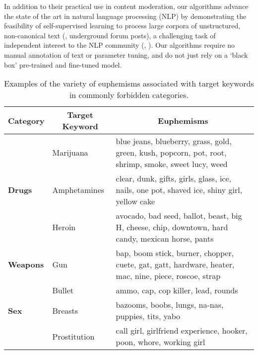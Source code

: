 In addition to their practical use in content moderation,
our algorithms advance the state of the art in natural language processing (NLP)
by demonstrating the feasibility of self-supervised learning
to process large corpora of unstructured, non-canonical text
(\eg, underground forum posts),
a challenging task of independent interest to the NLP community
(\eg, \cite{durrett2017identifying,portnoff2017tools,felbo2017using}).
Our algorithms require no manual annotation of text
or parameter tuning,
and do not just rely on a `black box'  pre-trained and
fine-tuned model.

\begin{table*}[t!]
	\centering
	\small
	\caption{Examples of the variety of euphemisms associated with target keywords in commonly forbidden categories.}
	\begin{tabular}{lll}
		\toprule
		\multicolumn{1}{c}{\textbf{Category}} & \multicolumn{1}{c}{\textbf{Target Keyword}} & \multicolumn{1}{c}{\textbf{Euphemisms}} \\
		\midrule
                                 & Marijuana    & blue jeans, blueberry, grass, gold, green, kush, popcorn, pot, root, shrimp, smoke, sweet lucy, weed \\
                \textbf{Drugs}   & Amphetamines & clear, dunk, gifts, girls, glass, ice, nails, one pot, shaved ice, shiny girl, yellow cake \\
                                 & Heroin       & avocado, bad seed, ballot, beast, big H,  cheese, chip, downtown, hard candy, mexican horse, pants \\
                \addlinespace
                \textbf{Weapons} & Gun          & bap, boom stick, burner, chopper, cuete, gat, gatt, hardware, heater, mac, nine, piece, roscoe, strap \\
                                 & Bullet       & ammo, cap, cop killer, lead, rounds \\
                \addlinespace
                \textbf{Sex}     & Breasts      & bazooms, boobs, lungs, na-nas, puppies, tits, yabo \\
                                 & Prostitution & call girl, girlfriend experience, hooker, poon, whore, working girl \\
    \bottomrule
	\end{tabular}
	\label{table:example2}
\end{table*}

